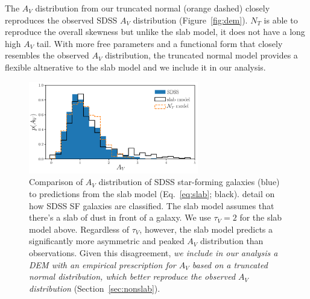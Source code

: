 The $A_V$ distribution from our truncated normal (orange dashed) closely
reproduces the observed SDSS $A_V$ distribution (Figure~\ref{fig:dem}). $N_T$
is able to reproduce the overall skewness but unlike the slab model, it does
not have a long high $A_V$ tail. With more free parameters and a functional
form that closely resembles the observed $A_V$ distribution, the truncated
normal model provides a flexible altnerative to the slab model and we include
it in our analysis.  

\begin{figure}
    \begin{center}
        \includegraphics[width=0.66\textwidth]{figs/slab_tnorm.pdf} 
        \caption{\label{fig:av_dist}
            Comparison of $A_V$ distribution of SDSS star-forming
        galaxies (blue) to predictions from the slab model (Eq.~\ref{eq:slab};
        black). {\color{red} detail on how SDSS SF galaxies are classified.} 
        The slab model assumes that there's a slab of dust in front of a galaxy.
        We use $\tau_V=2$ for the slab model above. Regardless of $\tau_V$,
        however, the slab model predicts a significantly more asymmetric and peaked $A_V$ distribution
        than observations. Given this disagreement, {\em we include in our
        analysis a DEM with an empirical prescription for $A_V$ based on a truncated normal 
        distribution, which better reproduce the observed $A_V$ distribution} (Section~\ref{sec:nonslab}). }
    \end{center}
\end{figure}

